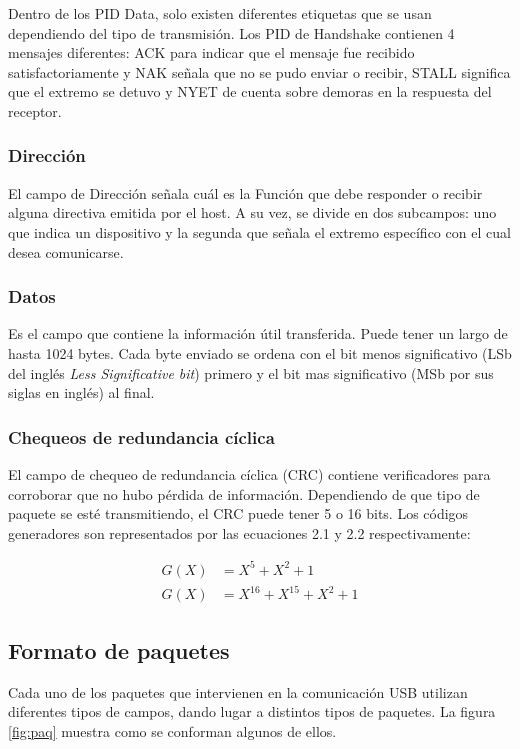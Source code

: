 		Dentro de los PID Data, solo existen diferentes etiquetas que se usan dependiendo del tipo de transmisión. Los PID de Handshake contienen 4 mensajes diferentes: ACK para indicar que el mensaje fue recibido satisfactoriamente y NAK señala que no se pudo enviar o recibir, STALL significa que el extremo se detuvo y NYET de cuenta sobre demoras en la respuesta del receptor.
	
	\subsubsection*{Dirección}
		El campo de Dirección señala cuál es la Función que debe responder o recibir alguna directiva emitida por el host. A su vez, se divide en dos subcampos: uno que indica un dispositivo y la segunda que señala el extremo específico con el cual desea comunicarse.

	\subsubsection*{Datos}
		Es el campo que contiene la información útil transferida. Puede tener un largo de hasta 1024 bytes. Cada byte enviado se ordena con el bit menos significativo (LSb del inglés {\it Less Significative bit}) primero y el bit mas significativo (MSb por sus siglas en inglés) al final.

	\subsubsection*{Chequeos de redundancia cíclica}
		El campo de chequeo de redundancia cíclica (CRC) contiene verificadores para corroborar que no hubo pérdida de información. Dependiendo de que tipo de paquete se esté transmitiendo, el CRC puede tener 5 o 16 bits. Los códigos generadores son representados por las ecuaciones 2.1 y 2.2 respectivamente:
	
		\begin{center}
			\begin{align}
				G(X)&=X^5+X^2+1\\
				G(X)&=X^16+X^15+X^2+1
			\end{align}
		\end{center}
	
\subsection{Formato de paquetes}
	Cada uno de los paquetes que intervienen en la comunicación USB utilizan diferentes tipos de campos, dando lugar a distintos tipos de paquetes. La figura \ref{fig:paq} muestra como se conforman algunos de ellos.\\ 

